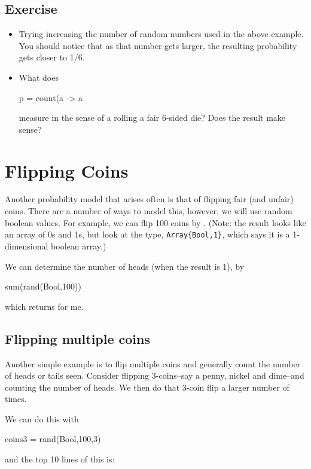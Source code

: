 \subsection{Exercise}

\begin{itemize}
\item Trying increasing the number of random numbers used in the above example.  You should notice that as that number gets larger, the resulting probability gets closer to 1/6. 
\item What does 
\begin{jlblock}[prob]
p = count(a -> a %
\end{jlblock}
measure in the sense of a rolling a fair 6-sided die?  Does the result make sense?

\end{itemize}


\section{Flipping Coins}

Another probability model that arises often is that of flipping fair (and unfair) coins.  There are a number of ways to model this, however, we will use random boolean values.  For example, we can flip 100 coins by .  (Note: the result looks like an array of 0s and 1s, but look at the type, \verb!Array{Bool,1}!, which says it is a 1-dimensional boolean array.)

We can determine the number of heads (when the result is 1), by
\begin{jlblock}[prob]
sum(rand(Bool,100))
\end{jlblock}
which returns  \printpythontex for me.  


\subsection{Flipping multiple coins}

Another simple example is to flip multiple coins and generally count the number of heads or tails seen.  Consider flipping 3-coins--say a penny, nickel and dime--and counting the number of heads.  We then do that 3-coin flip a larger number of times.  

We can do this with
\begin{jlblock}[prob]
coins3 = rand(Bool,100,3)
\end{jlblock}
and the top  10 lines of this is:  \printpythontex[verbatim]

